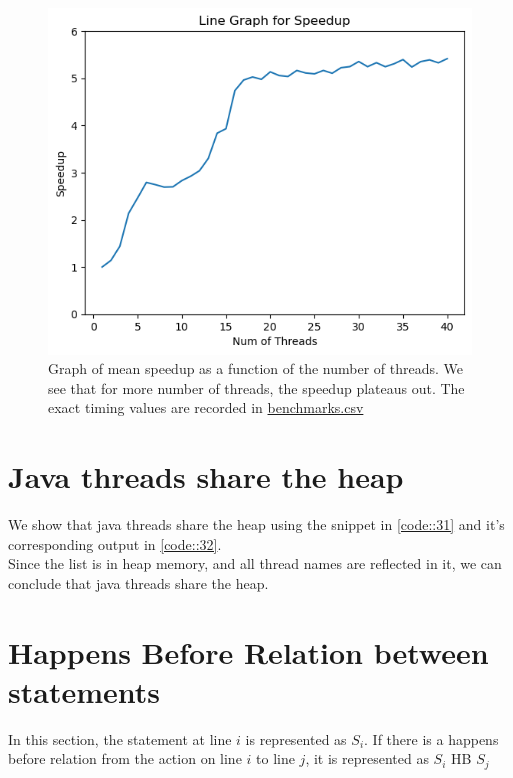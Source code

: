 \documentclass{article}
\begin{document}
    \begin{figure}[h]
      \centering
      \includegraphics[scale=0.5]{2_amdahl/speedup_graph.png}
      \caption{Graph of mean speedup as a function of the number of threads. We see that for more number of threads, the speedup plateaus out. The exact timing values are recorded in \href{run:./2_amdahl/benchmarks.csv}{benchmarks.csv}}
      \label{fig::21}
    \end{figure}
  \section{Java threads share the heap}
    We show that java threads share the heap using the snippet in \cref{code::31} and it's corresponding output in \cref{code::32}.\\
    Since the list is in heap memory, and all thread names are reflected in it, we can conclude that java threads share the heap.

    

    

  \section{Happens Before Relation between statements}
    In this section, the statement at line $i$ is represented as $S_i$. If there is a happens before relation from the action on line $i$ to line $j$, it is represented as $S_i$ HB $S_j$ 
\end{document}
